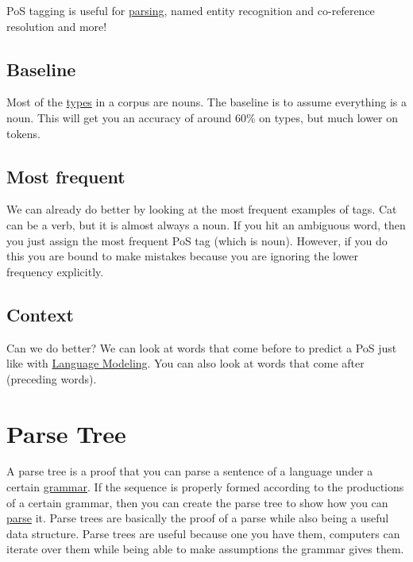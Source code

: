 \documentclass[
  11pt,
  british,
]{article}
\begin{document}
PoS tagging is useful for \href{Parsing.md}{parsing}, named entity
recognition and co-reference resolution and more!

\hypertarget{baseline}{%
\subsection{Baseline}\label{baseline}}

Most of the \href{../Data/Type.md}{types} in a corpus are nouns. The
baseline is to assume everything is a noun. This will get you an
accuracy of around 60\% on types, but much lower on tokens.

\hypertarget{most-frequent}{%
\subsection{Most frequent}\label{most-frequent}}

We can already do better by looking at the most frequent examples of
tags. Cat can be a verb, but it is almost always a noun. If you hit an
ambiguous word, then you just assign the most frequent PoS tag (which is
noun). However, if you do this you are bound to make mistakes because
you are ignoring the lower frequency explicitly.

\hypertarget{context-2}{%
\subsection{Context}\label{context-2}}

Can we do better? We can look at words that come before to predict a PoS
just like with \href{../Prediction/Language\%20Modeling.md}{Language
Modeling}. You can also look at words that come after (preceding words).

\hypertarget{parse-tree}{%
\section{Parse Tree}\label{parse-tree}}

A parse tree is a proof that you can parse a sentence of a language
under a certain \href{Grammar.md}{grammar}. If the sequence is properly
formed according to the productions of a certain grammar, then you can
create the parse tree to show how you can \href{Parsing.md}{parse} it.
Parse trees are basically the proof of a parse while also being a useful
data structure. Parse trees are useful because one you have them,
computers can iterate over them while being able to make assumptions the
grammar gives them.
\end{document}
